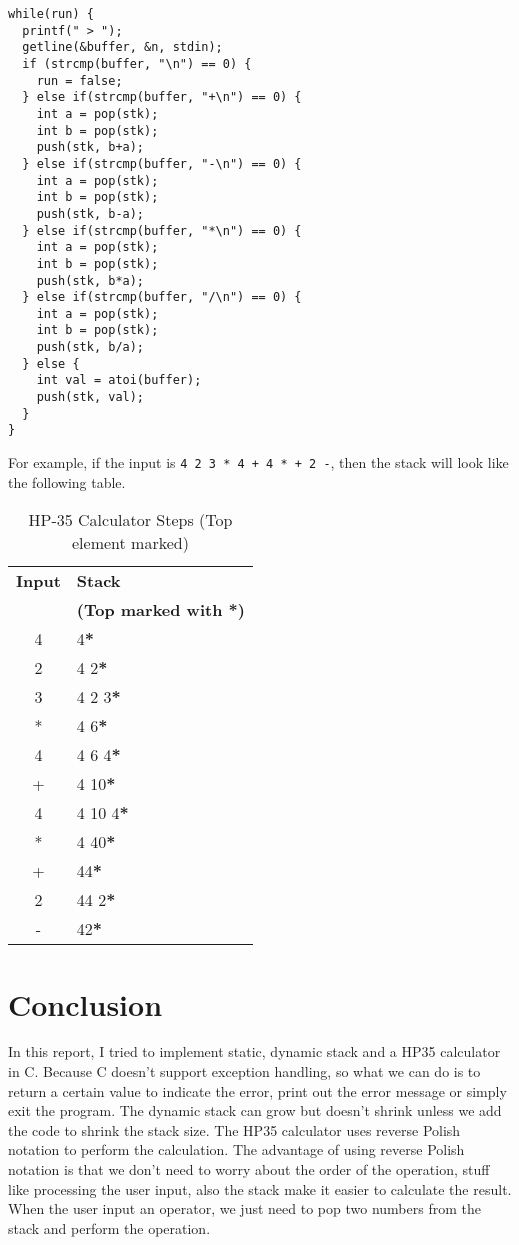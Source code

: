 \documentclass[a4paper,11pt]{article}
\begin{document}
\begin{verbatim}
while(run) {
  printf(" > ");
  getline(&buffer, &n, stdin);
  if (strcmp(buffer, "\n") == 0) {
    run = false;
  } else if(strcmp(buffer, "+\n") == 0) {
    int a = pop(stk);
    int b = pop(stk);
    push(stk, b+a);
  } else if(strcmp(buffer, "-\n") == 0) {
    int a = pop(stk);
    int b = pop(stk);
    push(stk, b-a);
  } else if(strcmp(buffer, "*\n") == 0) {
    int a = pop(stk);
    int b = pop(stk);
    push(stk, b*a);
  } else if(strcmp(buffer, "/\n") == 0) {
    int a = pop(stk);
    int b = pop(stk);
    push(stk, b/a);
  } else {
    int val = atoi(buffer);
    push(stk, val);
  }
}
\end{verbatim}

For example, if the input is {\tt 4 2 3 * 4 + 4 * + 2 -}, then the stack will look like the following table.

\begin{table}[h!]
  \centering
  \begin{tabular}{|c|p{4cm}|}
  \hline
  \textbf{Input} & \textbf{Stack} \\ 
                 & \textbf{(Top marked with \textbf{*})} \\ \hline
  4      & 4\textbf{*} \\ \hline
  2      & 4 2\textbf{*} \\ \hline
  3      & 4 2 3\textbf{*} \\ \hline
  *      & 4 6\textbf{*} \\ \hline
  4      & 4 6 4\textbf{*} \\ \hline
  +      & 4 10\textbf{*} \\ \hline
  4      & 4 10 4\textbf{*} \\ \hline
  *      & 4 40\textbf{*} \\ \hline
  +      & 44\textbf{*} \\ \hline
  2      & 44 2\textbf{*} \\ \hline
  -      & 42\textbf{*} \\ \hline
  \end{tabular}
  \caption{HP-35 Calculator Steps (Top element marked)}
\end{table}

\section*{Conclusion}

In this report, I tried to implement static, dynamic stack and a HP35 calculator in C.
Because C doesn't support exception handling, so what we can do is to return a certain 
value to indicate the error, print out the error message or simply exit the program.
The dynamic stack can grow but doesn't shrink unless we add the code to shrink the stack size.
The HP35 calculator uses reverse Polish notation to perform the calculation. The advantage of
using reverse Polish notation is that we don't need to worry about the order of the operation, 
stuff like processing the user input, also the stack make it easier to calculate the result.
When the user input an operator, we just need to pop two numbers from the stack and perform the operation.
\end{document}

